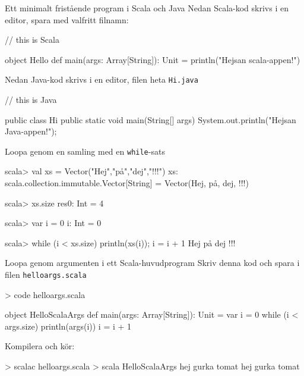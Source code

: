 
\begin{Slide}{Ett minimalt fristående program i Scala och Java}
Nedan Scala-kod skrivs i en editor, spara med valfritt filnamn:
\begin{Code}
// this is Scala

object Hello {
  def main(args: Array[String]): Unit = {
    println("Hejsan scala-appen!")
  }
}
\end{Code}

\pause
\vspace{1em}
Nedan Java-kod skrivs i en editor, filen  heta \texttt{Hi.java}

\begin{Code}[language=Java]
// this is Java

public class Hi {
    public static void main(String[] args) {
        System.out.println("Hejsan Java-appen!");
    }
}
\end{Code}

\end{Slide}


\begin{Slide}{Loopa genom en samling med en \texttt{while}-sats}
\begin{REPLnonum}
scala> val xs = Vector("Hej","på","dej","!!!")
xs: scala.collection.immutable.Vector[String] =
  Vector(Hej, på, dej, !!!)

scala> xs.size
res0: Int = 4

scala> var i = 0
i: Int = 0

scala> while (i < xs.size) { println(xs(i)); i = i + 1 }
Hej
på
dej
!!!
\end{REPLnonum}
\end{Slide}


\begin{Slide}{Loopa genom argumenten i ett Scala-huvudprogram}
Skriv denna kod och spara i filen \texttt{helloargs.scala}
\begin{REPLnonum}
> code helloargs.scala
\end{REPLnonum}
\begin{Code}
object HelloScalaArgs {
  def main(args: Array[String]): Unit = {
    var i = 0
    while (i < args.size) {
      println(args(i))
      i = i + 1
    }
  }
}
\end{Code}
Kompilera och kör:
\begin{REPL}
> scalac helloargs.scala
> scala HelloScalaArgs hej gurka tomat
hej
gurka
tomat
\end{REPL}
\end{Slide}


